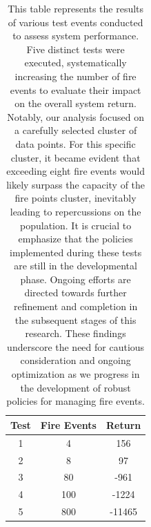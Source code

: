 \documentclass[lettersize,journal]{IEEEtran}
\begin{document}
          \begin{table}
            \centering
            \caption{This table represents the results of various test events conducted to assess system performance. Five distinct tests were executed, systematically increasing the number of fire events to evaluate their impact on the overall system return. Notably, our analysis focused on a carefully selected cluster of data points.
            For this specific cluster, it became evident that exceeding eight fire events would likely surpass the capacity of the fire points cluster, inevitably leading to repercussions on the population. It is crucial to emphasize that the policies implemented during these tests are still in the developmental phase. Ongoing efforts are directed towards further refinement and completion in the subsequent stages of this research.
            These findings underscore the need for cautious consideration and ongoing optimization as we progress in the development of robust policies for managing fire events.
            }
            
            
            \begin{tabular}{|c|c|c|}
              \hline
              \textbf{Test} & \textbf{Fire Events} & \textbf{Return} \\
              \hline
              1 & 4 & 156 \\
              2 & 8 & 97 \\
              3 & 80 & -961 \\
              4 & 100 & -1224 \\
              5 & 800 & -11465 \\
              \hline
              \end{tabular}
          \end{table}












\end{document}
